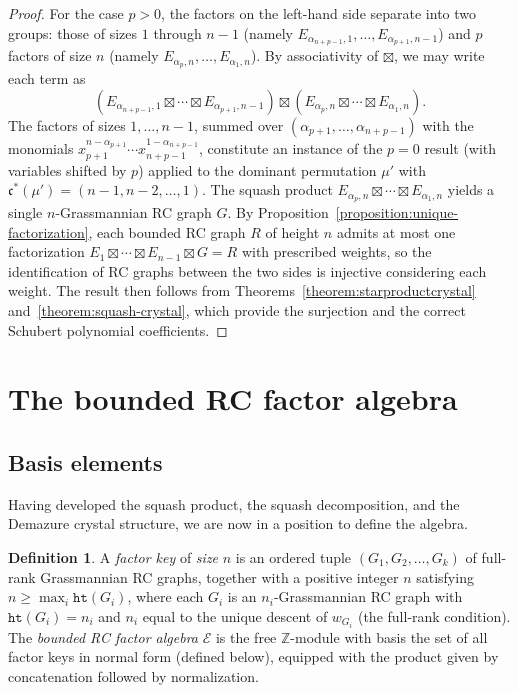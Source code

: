 \documentclass{amsart}
\theoremstyle{definition}
\newtheorem{definition}[lemma]{Definition}
\theoremstyle{remark}
\numberwithin{equation}{section}
\newcommand{\wof}[1]{w_{#1}}
\newcommand{\hr}{\mathtt{ht}}
\newcommand{\code}{\mathfrak{c}}
\begin{document}
\begin{proof}
For the case $p>0$, the factors on the left-hand side separate into two groups: those of sizes $1$ through $n-1$ (namely $E_{\alpha_{n+p-1},1}, \ldots, E_{\alpha_{p+1},n-1}$) and $p$ factors of size $n$ (namely $E_{\alpha_p,n}, \ldots, E_{\alpha_1,n}$).  By associativity of $\boxtimes$, we may write each term as
\[
\left(E_{\alpha_{n+p-1},1}\boxtimes \cdots \boxtimes E_{\alpha_{p+1},n-1}\right) \boxtimes \left(E_{\alpha_p,n}\boxtimes \cdots \boxtimes E_{\alpha_1,n}\right).
\]
The factors of sizes $1, \ldots, n-1$, summed over $(\alpha_{p+1}, \ldots, \alpha_{n+p-1})$ with the monomials $x_{p+1}^{n - \alpha_{p+1}} \cdots x_{n+p-1}^{1 - \alpha_{n+p-1}}$, constitute an instance of the $p = 0$ result (with variables shifted by $p$) applied to the dominant permutation $\mu'$ with $\code^*(\mu') = (n-1, n-2, \ldots, 1)$.  The squash product $E_{\alpha_p,n} \boxtimes \cdots \boxtimes E_{\alpha_1,n}$ yields a single $n$-Grassmannian RC graph $G$.  By Proposition~\ref{proposition:unique-factorization}, each bounded RC graph $R$ of height $n$ admits at most one factorization $E_1 \boxtimes \cdots \boxtimes E_{n-1} \boxtimes G = R$ with prescribed weights, so the identification of RC graphs between the two sides is injective considering each weight.  The result then follows from Theorems~\ref{theorem:starproductcrystal} and~\ref{theorem:squash-crystal}, which provide the surjection and the correct Schubert polynomial coefficients.
\end{proof}

\section{The bounded RC factor algebra}\label{section:algebra}

\subsection{Basis elements}

Having developed the squash product, the squash decomposition, and the Demazure crystal structure, we are now in a position to define the algebra.

\begin{definition}\label{definition:brfa}
A \textit{factor key} of \textit{size} $n$ is an ordered tuple $(G_1, G_2, \ldots, G_k)$ of full-rank Grassmannian RC graphs, together with a positive integer $n$ satisfying $n \geq \max_i \hr(G_i)$, where each $G_i$ is an $n_i$-Grassmannian RC graph with $\hr(G_i) = n_i$ and $n_i$ equal to the unique descent of $\wof{G_i}$ (the full-rank condition).  The \textit{bounded RC factor algebra} $\mathcal{E}$ is the free $\mathbb{Z}$-module with basis the set of all factor keys in normal form (defined below), equipped with the product given by concatenation followed by normalization.
\end{definition}
\end{document}
